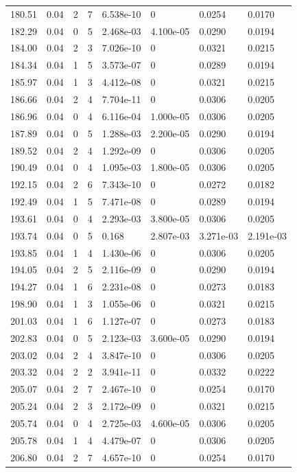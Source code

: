 \documentclass[preview]{standalone}
\begin{document}
{{{{{\begin{tabular}{L{1.2cm}C{1.2cm} C{0.3cm}C{0.5cm} C{1.4cm}C{1.4cm} C{1.4cm}C{1.4cm}}
  180.51  &  0.04  & 2     &  7 &  6.538e-10  & 0  & 0.0254 &  0.0170   \\ 
  182.29  &  0.04  & 0     &  5 &  2.468e-03  & 4.100e-05  & 0.0290 &  0.0194   \\ 
  184.00  &  0.04  & 2     &  3 &  7.026e-10  & 0  & 0.0321 &  0.0215   \\ 
  184.34  &  0.04  & 1     &  5 &  3.573e-07  & 0  & 0.0289 &  0.0194   \\ 
  185.97  &  0.04  & 1     &  3 &  4.412e-08  & 0  & 0.0321 &  0.0215   \\ 
  186.66  &  0.04  & 2     &  4 &  7.704e-11  & 0  & 0.0306 &  0.0205   \\ 
  186.96  &  0.04  & 0     &  4 &  6.116e-04  & 1.000e-05  & 0.0306 &  0.0205   \\ 
  187.89  &  0.04  & 0     &  5 &  1.288e-03  & 2.200e-05  & 0.0290 &  0.0194   \\ 
  189.52  &  0.04  & 2     &  4 &  1.292e-09  & 0  & 0.0306 &  0.0205   \\ 
  190.49  &  0.04  & 0     &  4 &  1.095e-03  & 1.800e-05  & 0.0306 &  0.0205   \\ 
  192.15  &  0.04  & 2     &  6 &  7.343e-10  & 0  & 0.0272 &  0.0182   \\ 
  192.49  &  0.04  & 1     &  5 &  7.471e-08  & 0  & 0.0289 &  0.0194   \\ 
  193.61  &  0.04  & 0     &  4 &  2.293e-03  & 3.800e-05  & 0.0306 &  0.0205   \\ 
  193.74  &  0.04  & 0     &  5 &  0.168  & 2.807e-03  & 3.271e-03 &  2.191e-03   \\ 
  193.85  &  0.04  & 1     &  4 &  1.430e-06  & 0  & 0.0306 &  0.0205   \\ 
  194.05  &  0.04  & 2     &  5 &  2.116e-09  & 0  & 0.0290 &  0.0194   \\ 
  194.27  &  0.04  & 1     &  6 &  2.231e-08  & 0  & 0.0273 &  0.0183   \\ 
  198.90  &  0.04  & 1     &  3 &  1.055e-06  & 0  & 0.0321 &  0.0215   \\ 
  201.03  &  0.04  & 1     &  6 &  1.127e-07  & 0  & 0.0273 &  0.0183   \\ 
  202.83  &  0.04  & 0     &  5 &  2.123e-03  & 3.600e-05  & 0.0290 &  0.0194   \\ 
  203.02  &  0.04  & 2     &  4 &  3.847e-10  & 0  & 0.0306 &  0.0205   \\ 
  203.32  &  0.04  & 2     &  2 &  3.941e-11  & 0  & 0.0332 &  0.0222   \\ 
  205.07  &  0.04  & 2     &  7 &  2.467e-10  & 0  & 0.0254 &  0.0170   \\ 
  205.24  &  0.04  & 2     &  3 &  2.172e-09  & 0  & 0.0321 &  0.0215   \\ 
  205.74  &  0.04  & 0     &  4 &  2.725e-03  & 4.600e-05  & 0.0306 &  0.0205   \\ 
  205.78  &  0.04  & 1     &  4 &  4.479e-07  & 0  & 0.0306 &  0.0205   \\ 
  206.80  &  0.04  & 2     &  7 &  4.657e-10  & 0  & 0.0254 &  0.0170   \\ 
\hline 
\end{tabular} 

}}}}}
\end{document}
